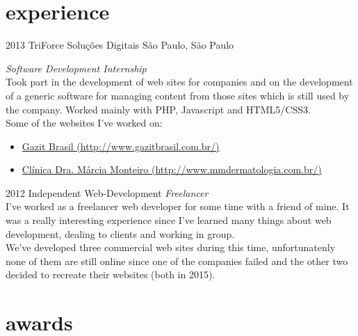 \documentclass[]{friggeri-cv} %
\begin{document}

\section{experience}

\begin{entrylist}


\entry
{2013}
{TriForce Soluções Digitais}
{São Paulo, São Paulo}
{\emph{Software Development Internship} \\
Took part in the development of web sites for companies and on the development of a generic software for managing content from those sites which is still used by the company. Worked mainly with PHP, Javascript and HTML5/CSS3. \\
Some of the websites I've worked on:
\begin{itemize}
\item \href{http://www.gazitbrasil.com.br/}{Gazit Brasil (http://www.gazitbrasil.com.br/)}
\item \href{http://www.mmdermatologia.com.br/}{Clínica Dra. Márcia Monteiro (http://www.mmdermatologia.com.br/)}
\end{itemize}}

\entry
{2012}
{Independent Web-Development}
{}
{\emph{Freelancer} \\
I've worked as a freelancer web developer for some time with a friend of mine. It was a really interesting experience since I've learned many things about web development, dealing to clients and working in group. \\
We've developed three commercial web sites during this time, unfortunatenly none of them are still online since one of the companies failed and the other two decided to recreate their websites (both in 2015).}

\end{entrylist}


\section{awards}
\end{document}
